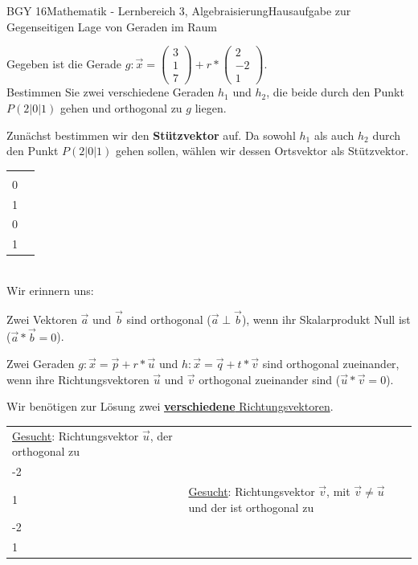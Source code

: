 \documentclass[oneside,openany,headings=optiontotoc,11pt,numbers=noenddot]{scrreprt}
\begin{document}
\begin{worksheet}{BGY 16}{Mathematik - Lernbereich 3, Algebraisierung}{Hausaufgabe zur Gegenseitigen Lage von Geraden im Raum}
\begin{framed}
			Gegeben ist die Gerade \(g: \vec{x} = \left(\begin{array}{c}3\\1\\7\end{array}\right) + r*\left(\begin{array}{c}2\\-2\\1\end{array}\right)\).\\
			Bestimmen Sie zwei verschiedene Geraden \(h_1\) und \(h_2\), die beide durch den Punkt \(P(2|0|1)\) gehen und orthogonal zu \(g\) liegen.\\
			\par\bigskip\noindent
			Zunächst bestimmen wir den \textbf{Stützvektor} auf. Da sowohl \(h_1\) als auch \(h_2\) durch den Punkt \(P(2|0|1)\) gehen sollen, wählen wir dessen Ortsvektor als Stützvektor.\\
			\begin{tabularx}{\textwidth}{XX}
				\(\vec{p_1} = \vec{0P} = \left(\begin{array}{c}2\\0\\1\end{array}\right)\) & \(\vec{p_2} = \vec{0P} = \left(\begin{array}{c}2\\0\\1\end{array}\right)\)
			\end{tabularx}\\
			Wir erinnern uns:
			\begin{framed}
				\noindent
				Zwei Vektoren \(\vec{a}\) und \(\vec{b}\) sind orthogonal (\(\vec{a}\perp\vec{b}\)), wenn ihr Skalarprodukt Null ist (\(\vec{a}*\vec{b} = 0\)).
			\end{framed}
			\begin{framed}
				\noindent
				Zwei Geraden \(g:\vec{x} = \vec{p} + r*\vec{u}\) und \(h: \vec{x} = \vec{q} + t*\vec{v}\) sind orthogonal zueinander, wenn ihre Richtungsvektoren \(\vec{u}\) und \(\vec{v}\) orthogonal zueinander sind (\(\vec{u}*\vec{v} = 0\)).
			\end{framed}
			\noindent
			Wir benötigen zur Lösung zwei \underline{\textbf{verschiedene} Richtungsvektoren}.\\
			\begin{tabularx}{\textwidth}{X|X}
				\underline{Gesucht}: Richtungsvektor \(\vec{u}\), der orthogonal zu \(\left(\begin{array}{c}2\\-2\\1\end{array}\right)\) ist. & \underline{Gesucht}: Richtungsvektor \(\vec{v}\), mit \(\vec{v} \neq \vec{u}\) und der ist orthogonal zu \(\vec{w} = \left(\begin{array}{c}2\\-2\\1\end{array}\right)\).\\

\end{tabularx}
\end{framed}
\end{worksheet}
\end{document}
